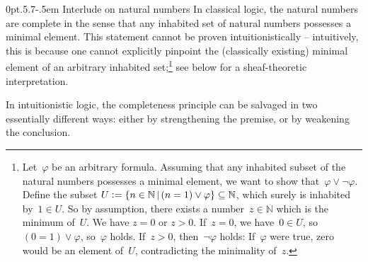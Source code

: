 \documentclass[10pt,reqno,a4paper]{amsbook}
\makeatletter
\theoremstyle{definition}
\theoremstyle{plain}
\theoremstyle{remark}
\newcommand{\NN}{\mathbb{N}}
\newcommand{\?}{\,{:}\,}
\renewcommand{\_}{\mathpunct{.}\,}
\newcommand{\defeq}{\vcentcolon=}
\def\subsection{\@startsection{subsection}{2}%
  {0pt}{.5\linespacing\@plus.7\linespacing}{-.5em}%
  {\normalfont\bfseries}}
\makeatother
\begin{document}
\subsection{Interlude on natural numbers}
In classical logic, the natural numbers are complete in the sense that any
inhabited set of natural numbers possesses a minimal element. This statement
cannot be proven intuitionistically -- intuitively, this is because one cannot
explicitly pinpoint the (classically existing) minimal element of an arbitrary
inhabited set;\footnote{Let~$\varphi$ be an arbitrary formula. Assuming that
any inhabited subset of the natural numbers possesses a minimal element, we
want to show that~$\varphi \vee \neg\varphi$. Define the subset $U \defeq \{ n \in
\NN \,|\, (n = 1) \vee \varphi \} \subseteq \NN$, which surely is inhabited by~$1
\in U$. So by assumption, there exists a number~$z \in \NN$ which is the
minimum of~$U$. We have $z = 0$ or $z > 0$. If~$z = 0$, we have~$0 \in U$,
so~$(0 = 1) \vee \varphi$, so~$\varphi$ holds.  If~$z > 0$, then~$\neg\varphi$
holds: If~$\varphi$ were true, zero would be an element of~$U$, contradicting
the minimality of~$z$.} see below for a sheaf-theoretic interpretation.

In intuitionistic logic, the completeness principle can be salvaged in two
essentially different ways: either by strengthening the premise, or by
weakening the conclusion.
\end{document}
